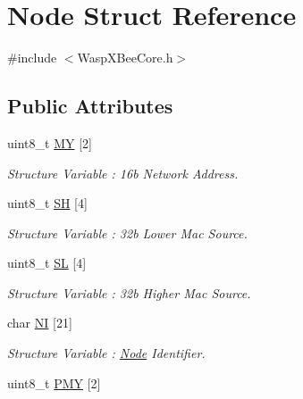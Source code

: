 \hypertarget{struct_node}{}\section{Node Struct Reference}
\label{struct_node}


{\ttfamily \#include $<$Wasp\+X\+Bee\+Core.\+h$>$}

\subsection*{Public Attributes}
\begin{DoxyCompactItemize}
\item 
uint8\+\_\+t \hyperlink{struct_node_a99ee5d130f8f295094e2c3f8236c1216}{MY} \mbox{[}2\mbox{]}\hypertarget{struct_node_a99ee5d130f8f295094e2c3f8236c1216}{}\label{struct_node_a99ee5d130f8f295094e2c3f8236c1216}

\begin{DoxyCompactList}\small\item\em Structure Variable \+: 16b Network Address. \end{DoxyCompactList}\item 
uint8\+\_\+t \hyperlink{struct_node_a5e0bc72ec82be256916c9f38d3cc1ef7}{SH} \mbox{[}4\mbox{]}\hypertarget{struct_node_a5e0bc72ec82be256916c9f38d3cc1ef7}{}\label{struct_node_a5e0bc72ec82be256916c9f38d3cc1ef7}

\begin{DoxyCompactList}\small\item\em Structure Variable \+: 32b Lower Mac Source. \end{DoxyCompactList}\item 
uint8\+\_\+t \hyperlink{struct_node_aba07455bb1642929e151e0a24e5cb74d}{SL} \mbox{[}4\mbox{]}\hypertarget{struct_node_aba07455bb1642929e151e0a24e5cb74d}{}\label{struct_node_aba07455bb1642929e151e0a24e5cb74d}

\begin{DoxyCompactList}\small\item\em Structure Variable \+: 32b Higher Mac Source. \end{DoxyCompactList}\item 
char \hyperlink{struct_node_a1baebe82b68abec0c20a1cc0a94785bd}{NI} \mbox{[}21\mbox{]}\hypertarget{struct_node_a1baebe82b68abec0c20a1cc0a94785bd}{}\label{struct_node_a1baebe82b68abec0c20a1cc0a94785bd}

\begin{DoxyCompactList}\small\item\em Structure Variable \+: \hyperlink{struct_node}{Node} Identifier. \end{DoxyCompactList}\item 
uint8\+\_\+t \hyperlink{struct_node_a80f6eedafbdab9dc04f86fac054a700e}{P\+MY} \mbox{[}2\mbox{]}\hypertarget{struct_node_a80f6eedafbdab9dc04f86fac054a700e}{}\label{struct_node_a80f6eedafbdab9dc04f86fac054a700e}


\end{DoxyCompactItemize}
